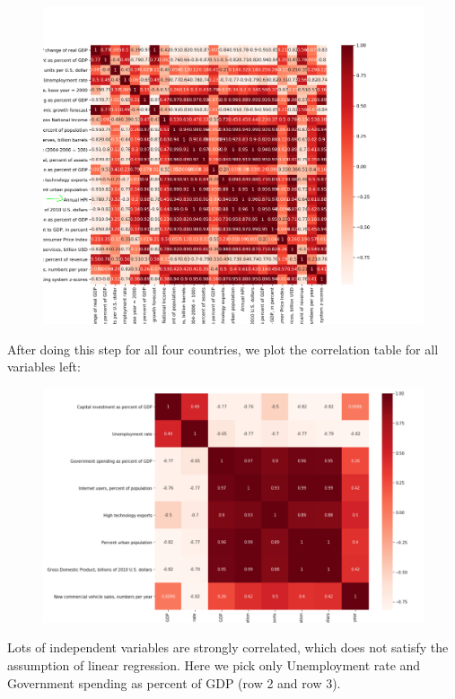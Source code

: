 \documentclass[11pt]{article}
\begin{document}
\begin{figure}[H]
\begin{center}
    \includegraphics[width=1.0\textwidth]{./image/CorrelationTable1.png}
\end{center}
\end{figure}
After doing this step for all four countries, we plot the correlation table for all variables left:
\begin{figure}[H]
\begin{center}
    \includegraphics[width=1.0\textwidth]{./image/CorrelationTable2.png}
\end{center}
\end{figure}
Lots of independent variables are strongly correlated, which does not satisfy the assumption of linear regression. Here we pick only Unemployment rate and Government spending as percent of GDP (row 2 and row 3).
\end{document}
